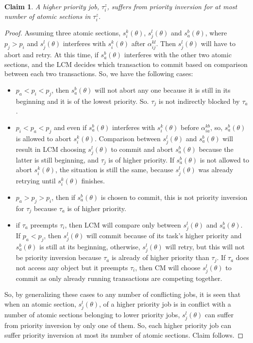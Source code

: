\documentclass[conference]{IEEEtran}
\newtheorem{clm}{Claim}
\begin{document}
\begin{clm}
\label{priority_inversion}
A higher priority job, $\tau_i^z$, suffers from priority inversion for at most number of atomic sections in $\tau_i^z$.
\end{clm}
\begin{proof}
Assuming three atomic sections, $s_i^k(\theta)$, $s_j^l(\theta)$ and $s_a^b(\theta)$, where $p_j > p_i$ and $s_j^l(\theta)$ interferes with $s_i^k(\theta)$ after $\alpha_{ij}^{kl}$. Then $s_j^l(\theta)$ will have to abort and retry. At this time, if $s_a^b(\theta)$ interferes with the other two atomic sections, and the LCM decides which transaction to commit based on comparison between each two transactions. So, we have the following cases:
\begin{itemize}
\item $p_a < p_i < p_j$, then $s_a^b(\theta)$ will not abort any one because it is still in its beginning and it is of the lowest priority. So. $\tau_j$ is not indirectly blocked by $\tau_a$.
\item $p_i<p_a<p_j$ and even if $s_a^b(\theta)$ interferes with $s_i^k(\theta)$ before $\alpha_{ia}^{kb}$, so, $s_a^b(\theta)$ is allowed to abort $s_i^k(\theta)$. Comparison between $s_j^l(\theta)$ and $s_a^b(\theta)$ will result in LCM choosing $s_j^l(\theta)$ to commit and abort $s_a^b(\theta)$ because the latter is still beginning, and $\tau_j$ is of higher priority. If $s_a^b(\theta)$ is not allowed to abort $s_i^k(\theta)$, the situation is still the same, because $s_j^l(\theta)$ was already retrying until $s_i^k(\theta)$ finishes.
\item $p_a>p_j>p_i$, then if $s_a^b(\theta)$ is chosen to commit, this is not priority inversion for $\tau_j$ because $\tau_a$ is of higher priority.
\item if $\tau_a$ preempts $\tau_i$, then LCM will compare only between $s_j^l(\theta)$ and $s_a^b(\theta)$. If $p_a<p_j$, then $s_j^l(\theta)$ will commit because of its task's higher priority and $s_a^b(\theta)$ is still at its beginning, otherwise, $s_j^l(\theta)$ will retry, but this will not be priority inversion because $\tau_a$ is already of higher priority than $\tau_j$. If $\tau_a$ does not access any object but it preempts $\tau_i$, then CM will choose $s_j^l(\theta)$ to commit as only already running transactions are competing together.
\end{itemize}
So, by generalizing these cases to any number of conflicting jobs, it is seen that when an atomic section, $s_j^l(\theta)$, of a higher priority job is in conflict with a number of atomic sections belonging to lower priority jobs, $s_j^l(\theta)$ can suffer from priority inversion by only one of them. So, each higher priority job can suffer priority inversion at most its number of atomic sections. Claim follows.
\end{proof}
\end{document}
